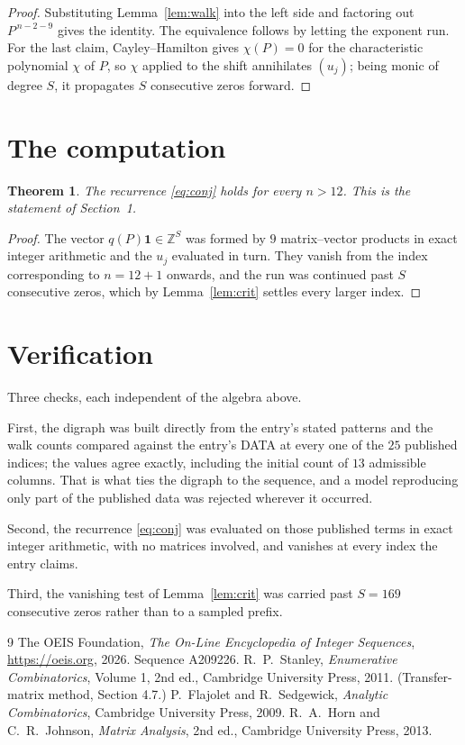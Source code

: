 \documentclass[11pt,a4paper]{article}
\theoremstyle{plain}
\newtheorem{theorem}{Theorem}
\theoremstyle{definition}
\begin{document}
\begin{proof}
Substituting Lemma~\ref{lem:walk} into the left side and factoring out
$P^{\,n-2-9}$ gives the identity. The equivalence follows by letting the exponent
run. For the last claim, Cayley--Hamilton gives $\chi(P)=0$ for the characteristic
polynomial $\chi$ of $P$, so $\chi$ applied to the shift annihilates $(u_j)$; being monic of
degree $S$, it propagates $S$ consecutive zeros forward.
\end{proof}

\section{The computation}

\begin{theorem}
The recurrence \eqref{eq:conj} holds for every $n>12$. This is the statement of
Section~1.
\end{theorem}

\begin{proof}
The vector $q(P)\mathbf{1}\in\mathbb{Z}^{S}$ was formed by $9$ matrix--vector
products in exact integer arithmetic and the $u_j$ evaluated in turn. They vanish from the
index corresponding to $n=12+1$ onwards, and the run was continued past $S$ consecutive
zeros, which by Lemma~\ref{lem:crit} settles every larger index.
\end{proof}

\section{Verification}

Three checks, each independent of the algebra above.

First, the digraph was built directly from the entry's stated patterns and the walk counts
compared against the entry's DATA at every one of the $25$ published indices; the
values agree exactly, including the initial count of $13$ admissible columns. That is
what ties the digraph to the sequence, and a model reproducing only part of the published
data was rejected wherever it occurred.

Second, the recurrence \eqref{eq:conj} was evaluated on those published terms in exact
integer arithmetic, with no matrices involved, and vanishes at every index the entry claims.

Third, the vanishing test of Lemma~\ref{lem:crit} was carried past $S=169$ consecutive
zeros rather than to a sampled prefix.

\begin{thebibliography}{9}
 The OEIS Foundation, \emph{The On-Line Encyclopedia of Integer
Sequences}, \url{https://oeis.org}, 2026. Sequence A209226.
 R.~P.~Stanley, \emph{Enumerative Combinatorics}, Volume 1, 2nd ed.,
Cambridge University Press, 2011. (Transfer-matrix method, Section 4.7.)
 P.~Flajolet and R.~Sedgewick, \emph{Analytic Combinatorics}, Cambridge
University Press, 2009.
 R.~A.~Horn and C.~R.~Johnson, \emph{Matrix Analysis}, 2nd ed., Cambridge
University Press, 2013.
\end{thebibliography}
\end{document}

